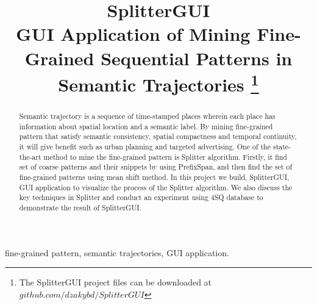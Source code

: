 \documentclass[conference]{IEEEtran}
\begin{document}
\title{SplitterGUI\\
{\large GUI Application of Mining Fine-Grained Sequential Patterns in Semantic Trajectories}
\thanks{The SplitterGUI project files can be downloaded at
$github.com/dzakybd/SplitterGUI$}
}

\author{
}

\maketitle

\begin{abstract}
Semantic trajectory is a sequence of time-stamped places wherein each place has information about spatial location and a semantic label. By mining fine-grained pattern that satisfy semantic consistency, spatial compactness and temporal continuity, it will give benefit such as urban planning and targeted advertising. One of the state-the-art method to mine the fine-grained pattern is Splitter algorithm. Firstly, it find set of coarse patterns and their snippets by using PrefixSpan, and then find the set of fine-grained patterns using mean shift method. In this project we build, SplitterGUI, GUI application to visualize the process of the Splitter algorithm. We also discuss the key techniques in Splitter and conduct an experiment using 4SQ database to demonstrate the result of SplitterGUI.

\end{abstract}

\begin{IEEEkeywords}
fine-grained pattern, semantic trajectories, GUI application.
\end{IEEEkeywords}
\end{document}
